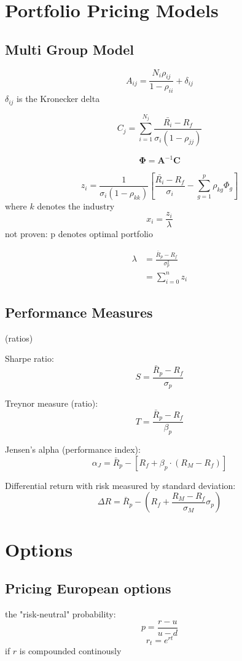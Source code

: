 \documentclass[]{amsart}
\newcommand{\p}[1]{\left(#1\right)}
\newcommand{\bs}[1]{\boldsymbol{#1}}
\begin{document}
\section{Portfolio Pricing Models}
\subsection{Multi Group Model}
	
$$ A_{ij} = \frac{N_i \rho_{ij}}{1-\rho_{ii}} + \delta_{ij} $$ 
$\delta_{ij}$ is the Kronecker delta 

$$ C_{j} = \sum_{i=1}^{N_j} \frac{\bar{R_i}-R_f}{\sigma_i \p{1-\rho_{jj}}} $$

$$ \bs{\Phi} = \bs{A}^{-1}\bs{C} $$

$$ z_i = \frac{1}{\sigma_i \p{1-\rho_{kk}}} \left[ \frac{\bar{R_i}-R_f}{\sigma_i} - \sum_{g=1}^p \rho_{kg} \Phi_g \right] $$ 
where $k$ denotes the industry 
$$ x_i = \frac{z_i}{\lambda} $$ 
not proven: p denotes optimal portfolio 

\begin{align*}
 \lambda &= \frac{\bar{R}_p-R_f}{\sigma_p^2} \\
  			 &= \sum_{i=0}^n z_i 
\end{align*}


\subsection{Performance Measures} 
(ratios)

Sharpe ratio:
$$ S = \frac{\bar{R}_p - R_f}{\sigma_p} $$

Treynor measure (ratio):
$$ T = \frac{\bar{R}_p - R_f}{\beta_p} $$  

Jensen's alpha (performance index):
$$ \alpha_J = \bar{R}_p - \left[R_f + \beta_p \cdot (R_M - R_f) \right] $$

Differential return with risk measured by standard deviation:
$$ \Delta R = \bar{R}_p - \left( R_f + \frac{R_M-R_f}{\sigma_M}\sigma_p \right) $$ 

\section{Options}
\subsection{Pricing European options} \hspace{0.1\textwidth} \newline
the "risk-neutral" probability:
$$ p = \frac{r-u}{u-d} $$ 
$$ r_t = e^{rt} $$ if $r$ is compounded continously 
\end{document}
